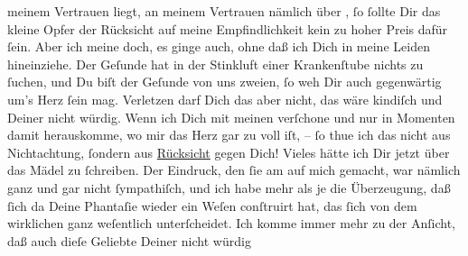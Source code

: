 \begin{ledgroupsized}[t]{13cm}
               meinem Vertrauen liegt, an meinem Vertrauen nämlich über \label{K_L02651-2v}\label{K_L02651-2h}, ſo ſollte Dir das kleine Opfer der Rücksicht auf meine
               Empfindlichkeit kein zu hoher Preis dafür ſein.\pend
           \pstart
           Aber ich meine doch, es ginge auch, ohne daß ich Dich in meine Leiden hineinziehe.
               Der Geſunde hat in der Stinkluft einer Krankenſtube nichts zu ſuchen, und Du biſt der
               Geſunde von uns zweien, ſo weh Dir auch gegenwärtig um’s Herz ſein mag. Verletzen
               darf Dich das aber nicht, das wäre kindiſch und Deiner nicht würdig. Wenn ich Dich
               mit meinen \label{K_L02651-3v}\label{K_L02651-3h} verſchone und nur in
                  {\pb}Momenten damit herauskomme, wo mir das Herz gar
               zu voll iſt, – ſo thue ich das nicht aus Nichtachtung, ſondern aus \uline{Rücksicht} gegen Dich! {\dotsfive}\pend
           \pstart
           Vieles hätte ich Dir jetzt über das Mädel zu ſchreiben. Der Eindruck, den ſie am \label{K_L02651-4v}\label{K_L02651-4h} auf mich gemacht, war nämlich
               ganz und gar nicht ſympathiſch, und ich habe mehr als je die Überzeugung, daß  ſich da Deine Phantaſie wieder ein Weſen conſtruirt hat, das ſich von dem wirklichen ganz
               weſentlich unterſcheidet. Ich komme immer mehr zu der Anſicht, daß auch dieſe Geliebte Deiner nicht würdig

\end{ledgroupsized}
